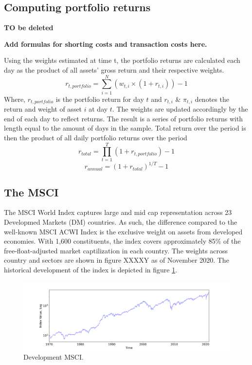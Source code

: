 
\newpage


\subsection{Computing portfolio returns}

\textbf{TO be deleted}

\textbf{Add formulas for shorting costs and transaction costs here.}

Using the weights estimated at time t, the portfolio returns are calculated each day as the product of all assets' gross return and their respective weights.
\begin{equation}
    r_{t,portfolio} = \sum_{i=1}^N \left(w_{t,i}\times(1+r_{t,i})\right)  - 1
\end{equation}
Where, $r_{t,portfolio}$ is the portfolio return for day $t$ and $r_{t,i}$ \& $\pi_{t,i}$ denotes the return and weight of asset $i$ at day $t$. The weights are updated accordingly by the end of each day to reflect returns. The result is a series of portfolio returns with length equal to the amount of days in the sample. Total return over the period is then the product of all daily portfolio returns over the period
\begin{equation}
    r_{total} = \prod_{t=1}^T (1+r_{t, portfolio} ) - 1
    \label{eq:total_ret}
\end{equation}
\begin{equation}
    r_{annual}=(1+r_{total})^{1/T}-1
    \label{eq:annual_ret}
\end{equation}

\subsection{The MSCI}
\label{subsection: MSCI Index}
The MSCI World Index captures large and mid cap representation across 23 Developmed Markets (DM) countries. As such, the difference compared to the well-known MSCI ACWI Index is the exclusive weight on assets from developed economies. With 1,600 constituents, the index covers approximately 85\% of the free-float-adjusted market captilization in each country. The weights across country and sectors are shown in figure XXXXY as of November 2020. The historical development of the index is depicted in figure \ref{fig:MSCI_index}. 
 
\begin{figure}[H] 
    \centering
    \includegraphics[width=1.0\textwidth]{analysis/data_description/images/MSCI_index.png}
    \caption{Development MSCI.}
    \label{fig:MSCI_index}
\end{figure}

